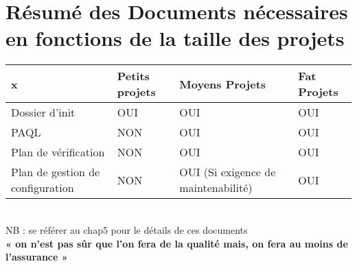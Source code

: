\section{Résumé des Documents nécessaires en fonctions de la taille des projets}

\begin{tabular}{|p{3cm}|p{3cm}|p{3cm}|p{3cm}|}
\hline
 x & Petits projets & Moyens Projets & Fat Projets\\
\hline
Dossier d'init & OUI & OUI & OUI\\
\hline
PAQL & NON & OUI & OUI\\
\hline
Plan de vérification & NON & OUI & OUI\\
\hline
Plan de gestion de configuration & NON & OUI (Si exigence de maintenabilité) & OUI\\
\hline
\end{tabular}
\hfill\\

NB : se référer au chap5 pour le détails de ces documents\\

\textbf{« on n'est pas sûr que l'on fera de la qualité mais, 
on fera au moins de l'assurance »}
